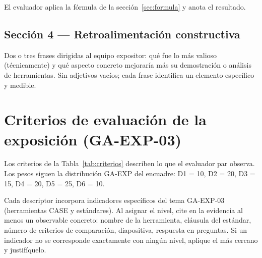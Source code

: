 \documentclass[11pt]{article}
\begin{document}
El evaluador aplica la fórmula de la sección~\ref{sec:formula} y anota el resultado.

\subsection{\textcolor{midblue}{Sección 4 --- Retroalimentación constructiva}}

Dos o tres frases dirigidas al equipo expositor: qué fue lo más valioso (técnicamente) y qué aspecto concreto mejoraría más su demostración o análisis de herramientas. Sin adjetivos vacíos; cada frase identifica un elemento específico y medible.

\section{\textcolor{utegreendk}{Criterios de evaluación de la exposición (GA-EXP-03)}}

Los criterios de la Tabla~\ref{tab:criterios} describen lo que el evaluador par observa. Los pesos siguen la distribución GA-EXP del encuadre: D1 = 10, D2 = 20, D3 = 15, D4 = 20, D5 = 25, D6 = 10.

\begin{cajaaviso}[title=Indicadores observables y medibles]
	Cada descriptor incorpora indicadores específicos del tema GA-EXP-03 (herramientas CASE y estándares). Al asignar el nivel, cite en la evidencia al menos un observable concreto: nombre de la herramienta, cláusula del estándar, número de criterios de comparación, diapositiva, respuesta en preguntas. Si un indicador no se corresponde exactamente con ningún nivel, aplique el más cercano y justifíquelo.
\end{cajaaviso}
\end{document}
